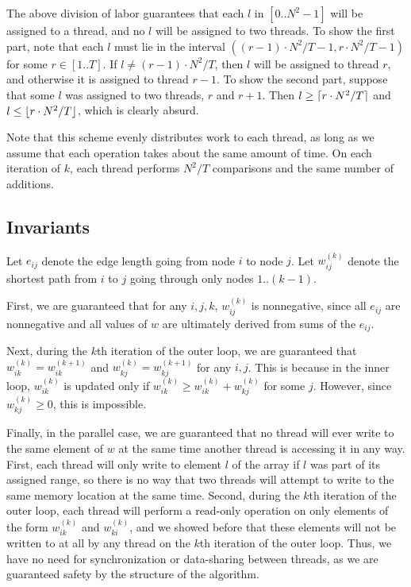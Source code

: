 \documentclass{article}
\DeclarePairedDelimiter\ceil{\lceil}{\rceil}
\DeclarePairedDelimiter\floor{\lfloor}{\rfloor}
\begin{document}
The above division of labor guarantees that each $l$ in $[0..N^2-1]$ will be assigned to a thread, and no $l$ will be assigned to two threads. To show the first part, note that each $l$ must lie in the interval $((r-1)\cdot N^2/T-1, r\cdot N^2/T-1)$ for some $r\in[1..T]$. If $l\neq (r-1)\cdot N^2/T$, then $l$ will be assigned to thread $r$, and otherwise it is assigned to thread $r-1$. To show the second part, suppose that some $l$ was assigned to two threads, $r$ and $r+1$. Then $l\geq\ceil{r\cdot N^2/T}$ and $l\leq\floor{r\cdot N^2/T}$, which is clearly absurd. 

Note that this scheme evenly distributes work to each thread, as long as we assume that each operation takes about the same amount of time. On each iteration of $k$, each thread performs $N^2/T$ comparisons and the same number of additions. 
\subsection*{Invariants}
Let $e_{ij}$ denote the edge length going from node $i$ to node $j$. Let $w_{ij}^{(k)}$ denote the shortest path from $i$ to $j$ going through only nodes $1..(k-1)$. 

First, we are guaranteed that for any $i, j, k$, $w_{ij}^{(k)}$ is nonnegative, since all $e_{ij}$ are nonnegative and all values of $w$ are ultimately derived from sums of the $e_{ij}$.

Next, during the $k$th iteration of the outer loop, we are guaranteed that $w_{ik}^{(k)}=w_{ik}^{(k+1)}$ and $w_{kj}^{(k)}=w_{kj}^{(k+1)}$ for any $i,j$. This is because in the inner loop, $w_{ik}^{(k)}$ is updated only if $w_{ik}^{(k)}\ge w_{ik}^{(k)}+w_{kj}^{(k)}$ for some $j$. However, since $w_{kj}^{(k)}\geq0$, this is impossible.

Finally, in the parallel case, we are guaranteed that no thread will ever write to the same element of $w$ at the same time another thread is accessing it in any way. First, each thread will only write to element $l$ of the array if $l$ was part of its assigned range, so there is no way that two threads will attempt to write to the same memory location at the same time. 
Second, during the $k$th iteration of the outer loop, each thread will perform a read-only operation on only elements of the form $w_{ik}^{(k)}$ and $w_{ki}^{(k)}$, and we showed before that these elements will not be written to at all by any thread on the $k$th iteration of the outer loop. Thus, we have no need for synchronization or data-sharing between threads, as we are guaranteed safety by the structure of the algorithm.
\end{document}
